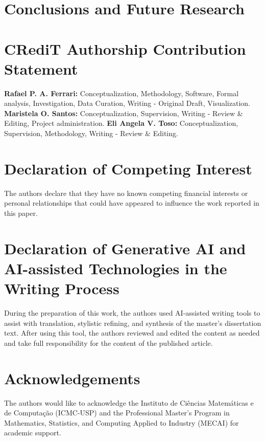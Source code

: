 \documentclass[preprint,12pt,authoryear]{elsarticle}
\begin{document}
\section{Conclusions and Future Research}
\label{sec:conclusions}
\lipsum[108-115]


\section*{CRediT Authorship Contribution Statement}
\textbf{Rafael P. A. Ferrari:} Conceptualization, Methodology, Software, Formal analysis, Investigation, Data Curation, Writing - Original Draft, Visualization. 
\textbf{Maristela O. Santos:} Conceptualization, Supervision, Writing - Review \& Editing, Project administration. 
\textbf{Eli Angela V. Toso:} Conceptualization, Supervision, Methodology, Writing - Review \& Editing.

\section*{Declaration of Competing Interest}
The authors declare that they have no known competing financial interests or personal relationships that could have appeared to influence the work reported in this paper.

\section*{Declaration of Generative AI and AI-assisted Technologies in the Writing Process}
During the preparation of this work, the authors used AI-assisted writing tools to assist with translation, stylistic refining, and synthesis of the master's dissertation text. After using this tool, the authors reviewed and edited the content as needed and take full responsibility for the content of the published article.

\section*{Acknowledgements}
The authors would like to acknowledge the Instituto de Ci\^encias Matem\'aticas e de Computa\c{c}\~ao (ICMC-USP) and the Professional Master's Program in Mathematics, Statistics, and Computing Applied to Industry (MECAI) for academic support.



\end{document}
